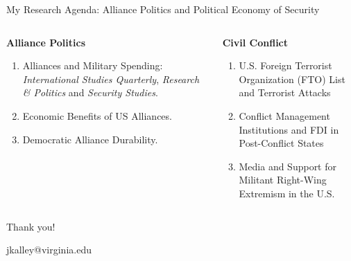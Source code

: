 \documentclass[12pt]{beamer}
\begin{document}
\begin{frame}{My Research Agenda: Alliance Politics and Political Economy of Security}

\begin{columns}

\begin{column}{0.5\textwidth}
\textbf{Alliance Politics}
\begin{enumerate} 
\item Alliances and Military Spending: \textit{International Studies Quarterly}, \textit{Research \& Politics} and  \textit{Security Studies}.
\item Economic Benefits of US Alliances. 
\item Democratic Alliance Durability.
\end{enumerate} 
\end{column}


\begin{column}{0.5\textwidth}
\textbf{Civil Conflict}
\begin{enumerate}
\item U.S. Foreign Terrorist Organization (FTO) List and Terrorist Attacks 
\item Conflict Management Institutions and FDI in Post-Conflict States
\item Media and Support for Militant Right-Wing Extremism in the U.S.
\end{enumerate} 
\end{column}


\end{columns}
 

\end{frame}




\begin{frame}[standout]

Thank you! 

jkalley@virginia.edu

\end{frame}


\appendix 



\end{document}
